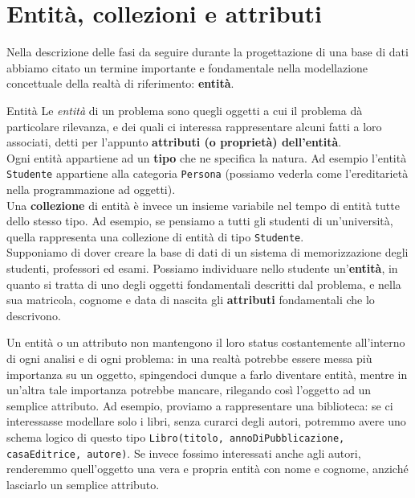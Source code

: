 \documentclass[12pt]{report}
\begin{document}
	\section{Entità, collezioni e attributi}
	Nella descrizione delle fasi da seguire durante la progettazione di una base di dati abbiamo citato un termine importante e fondamentale nella modellazione concettuale della realtà di riferimento: \textbf{entità}.
	\begin{definizione}{Entità}{}
		Le \textit{entità} di un problema sono quegli oggetti a cui il problema dà particolare rilevanza, e dei quali ci interessa rappresentare alcuni fatti a loro associati, detti per l'appunto \textbf{attributi (o proprietà) dell'entità}.\\
		Ogni entità appartiene ad un \textbf{tipo} che ne specifica la natura. Ad esempio l'entità \texttt{Studente} appartiene alla categoria \texttt{Persona} (possiamo vederla come l'ereditarietà nella programmazione ad oggetti).\\
		Una \textbf{collezione} di entità è invece un insieme variabile nel tempo di entità tutte dello stesso tipo. Ad esempio, se pensiamo a tutti gli studenti di un'università, quella rappresenta una collezione di entità di tipo \texttt{Studente}.\\
		\smallbreak
		Supponiamo di dover creare la base di dati di un sistema di memorizzazione degli studenti, professori ed esami. Possiamo individuare nello studente un'\textbf{entità}, in quanto si tratta di uno degli oggetti fondamentali descritti dal problema, e nella sua matricola, cognome e data di nascita gli \textbf{attributi} fondamentali che lo descrivono.
	\end{definizione}
	
	Un entità o un attributo non mantengono il loro status costantemente all'interno di ogni analisi e di ogni problema: in una realtà potrebbe essere messa più importanza su un oggetto, spingendoci dunque a farlo diventare entità, mentre in un'altra tale importanza potrebbe mancare, rilegando così l'oggetto ad un semplice attributo.
	Ad esempio, proviamo a rappresentare una biblioteca: se ci interessasse modellare solo i libri, senza curarci degli autori, potremmo avere uno schema logico di questo tipo \texttt{Libro(titolo, annoDiPubblicazione, casaEditrice, autore)}. Se invece fossimo interessati anche agli autori, renderemmo quell'oggetto una vera e propria entità con nome e cognome, anziché lasciarlo un semplice attributo.
	
\end{document}
